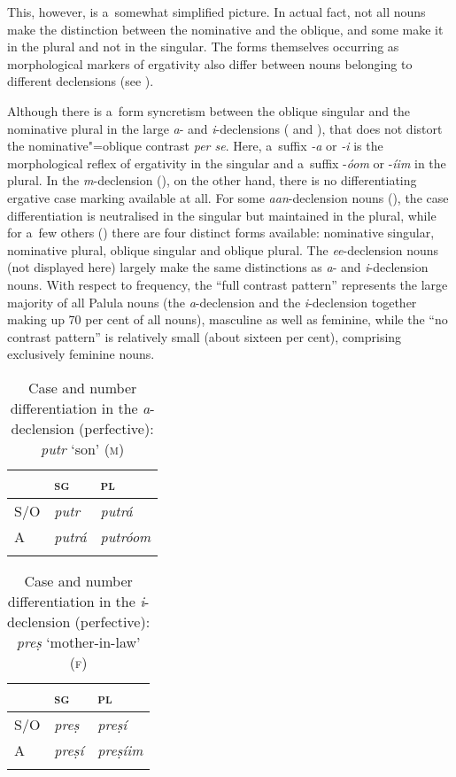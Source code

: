 This, however, is a~somewhat simplified picture. In actual fact, not all nouns make the distinction between the nominative and the oblique, and some make it in the plural and not in the singular. The forms themselves occurring as morphological markers of ergativity also differ between nouns belonging to different declensions (see ). 


Although there is a~form syncretism between the oblique singular and the nominative plural in the large \textit{a}- and \textit{i}-declensions ( and ), that does not distort the nominative"=oblique contrast \textit{per se}. Here, a~suffix \textit{-a} or \textit{-i} is the morphological reflex of ergativity in the singular and a~suffix -\textit{óom} or -\textit{íim} in the plural. In the \textit{m}-declension (), on the other hand, there is no differentiating ergative case marking available at all. For some \textit{aan}-declension nouns (), the case differentiation is neutralised in the singular but maintained in the plural, while for a~few others () there are four distinct forms available: nominative singular, nominative plural, oblique singular and oblique plural. The \textit{ee}-declension nouns (not displayed here) largely make the same distinctions as \textit{a}- and \textit{i}-declension nouns. With respect to frequency, the ``full contrast pattern'' represents the large majority of all Palula nouns (the \textit{a}-declension and the \textit{i}-declension together making up 70 per cent of all nouns), masculine as well as feminine, while the ``no contrast pattern'' is relatively small (about sixteen per cent), comprising exclusively feminine nouns.


\begin{table}[ht]
\caption{Case and number differentiation in the \textit{a}-declension (perfective): \textit{putr} `son' \textsc{(m)}} 
\begin{tabularx}{\textwidth}{ Q Q Q }
\lsptoprule
&
\textsc{sg} &
\textsc{pl}\\\hline
S/O &
\textit{putr} &
\textit{putrá} \\
A &
\textit{putrá} &
\textit{putróom}\\\lspbottomrule
\end{tabularx}
\label{tab:11-adecl}
\end{table}


\begin{table}[ht]
\caption{Case and number differentiation in the \textit{i}-declension (perfective): \textit{preṣ} `mother-in-law' \textsc{(f)}}
\begin{tabularx}{\textwidth}{ Q Q Q }
\lsptoprule
&
\textsc{sg} &
\textsc{pl}\\\hline
S/O &
\textit{preṣ} &
\textit{preṣí} \\
A &
\textit{preṣí} &
\textit{preṣíim} \\\lspbottomrule
\end{tabularx}
\label{tab:11-idecl}
\end{table}



